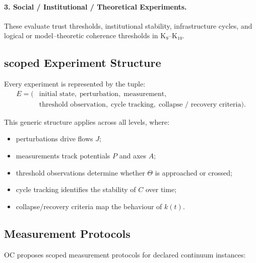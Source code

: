 \paragraph{3. Social / Institutional / Theoretical Experiments.}
These evaluate trust thresholds, institutional stability, infrastructure
cycles, and logical or model–theoretic coherence thresholds in K₉–K₁₀.


\subsection{scoped Experiment Structure}

Every experiment is represented by the tuple:
\[
\begin{aligned}
   E = (&\text{initial state},\;
         \text{perturbation},\;
         \text{measurement},\\
        &\text{threshold observation},\;
         \text{cycle tracking},\;
         \text{collapse / recovery criteria}).
\end{aligned}
\]

This generic structure applies across all levels, where:

\begin{itemize}
    \item perturbations drive flows $J$;
    \item measurements track potentials $P$ and axes $A$;
    \item threshold observations determine whether $\Theta$ is approached or
          crossed;
    \item cycle tracking identifies the stability of $C$ over time;
    \item collapse/recovery criteria map the behaviour of $k(t)$.
\end{itemize}


\subsection{Measurement Protocols}

OC proposes scoped measurement protocols for declared continuum instances:


